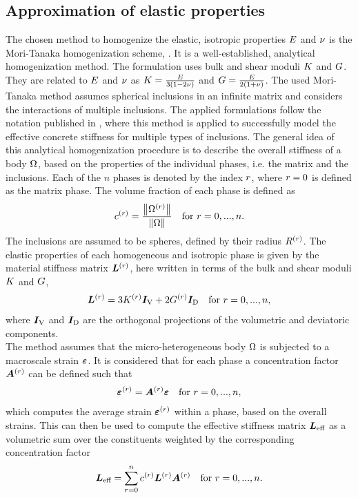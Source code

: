 \subsection{Approximation of elastic properties}\label{ssec:mt_elastic}
The chosen method to homogenize the elastic, isotropic properties $E$ and $\nu$ is the Mori-Tanaka homogenization scheme, \cite{mor_1973_asi}.
It is a well-established, analytical homogenization method.
The formulation uses bulk and shear moduli $K$ and $G$.
They are related to $E$ and $\nu$ as $K = \frac{E}{3(1-2\nu)}$ and $G = \frac{E}{2(1+\nu)}$.
The used Mori-Tanaka method assumes spherical inclusions in an infinite matrix and considers the interactions of multiple inclusions.
The applied formulations follow the notation published in 
\cite{nee_2012_ammf}, where this method is applied to successfully model the effective concrete stiffness for multiple types of inclusions.
The general idea of this analytical homogenization procedure is to describe the overall stiffness of a body $\Omega$, based on the properties of the individual phases, i.e. the matrix and the inclusions.
Each of the $n$ phases is denoted by the index $r$, where $r = 0$ is defined as the matrix phase.
The volume fraction of each phase is defined as
\begin{align}
	c^{(r)} = \frac{\left\| \Omega^{(r)} \right\|}{\left\| \Omega \right\|} \quad  \text{for}~ r = 0, ..., n.
\end{align}
The inclusions are assumed to be spheres, defined by their radius $R^{(r)}$.
The elastic properties of each homogeneous and isotropic phase is given by the material stiffness matrix $\boldsymbol{L}^{(r)}$, here written in terms of the bulk and shear moduli $K$ and $G$,
\begin{align}
	\boldsymbol{L}^{(r)}= 3 K^{(r)} \boldsymbol{I}_{\text{V}} + 2 G^{(r)} \boldsymbol{I}_{\text{D}}  \quad \text{for}~ r = 0, ..., n, \label{eq:Lr}
\end{align}
where $\boldsymbol{I}_{\text{V}}$ and $\boldsymbol{I}_{\text{D}}$ are the orthogonal projections of the volumetric and deviatoric components.\\
The method assumes that the micro-heterogeneous body $\Omega$ is subjected to a macroscale strain $\boldsymbol{\varepsilon}$.
It is considered that for each phase a concentration factor $\boldsymbol{A}^{(r)}$ can be defined such that
\begin{align}
	\boldsymbol{\varepsilon}^{(r)} = \boldsymbol{A}^{(r)}\boldsymbol{\varepsilon} \quad  \text{for}~ r = 0, ..., n, \label{eq:strainaverage}
\end{align}
which computes the average strain $\boldsymbol{\varepsilon}^{(r)}$ within a phase, based on the overall strains.
This can then be used to compute the effective stiffness matrix $\boldsymbol{L}_{\text{eff}}$ as a volumetric sum over the constituents weighted by the corresponding concentration factor 
\begin{align}
	\boldsymbol{L}_{\text{eff}} = \sum_{r=0}^{n} c^{(r)} \boldsymbol{L}^{(r)}\boldsymbol{A}^{(r)} \quad  \text{for}~ r = 0, ..., n.\label{eq:Leff}
\end{align}


